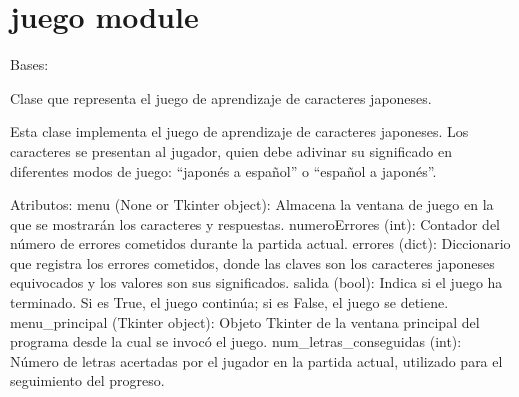 \documentclass[letterpaper,10pt,spanish]{sphinxmanual}
\begin{document}
\sphinxstepscope


\chapter{juego module}
\label{\detokenize{juego:module-juego}}\label{\detokenize{juego:juego-module}}\label{\detokenize{juego::doc}}

\begin{fulllineitems}
\label{\detokenize{juego:juego.Juego}}
\pysigstartsignatures
{}
\pysigstopsignatures
\sphinxAtStartPar
Bases: 

\sphinxAtStartPar
Clase que representa el juego de aprendizaje de caracteres japoneses.

\sphinxAtStartPar
Esta clase implementa el juego de aprendizaje de caracteres japoneses. Los caracteres se presentan al jugador,
quien debe adivinar su significado en diferentes modos de juego: “japonés a español” o “español a japonés”.

\sphinxAtStartPar
Atributos:
\sphinxhyphen{} menu (None or Tkinter object): Almacena la ventana de juego en la que se mostrarán los caracteres y respuestas.
\sphinxhyphen{} numeroErrores (int): Contador del número de errores cometidos durante la partida actual.
\sphinxhyphen{} errores (dict): Diccionario que registra los errores cometidos, donde las claves son los caracteres japoneses
equivocados y los valores son sus significados.
\sphinxhyphen{} salida (bool): Indica si el juego ha terminado. Si es True, el juego continúa; si es False, el juego se detiene.
\sphinxhyphen{} menu\_principal (Tkinter object): Objeto Tkinter de la ventana principal del programa desde la cual se invocó el
juego.
\sphinxhyphen{} num\_letras\_conseguidas (int): Número de letras acertadas por el jugador en la partida actual, utilizado para
el seguimiento del progreso.


\end{fulllineitems}
\end{document}
